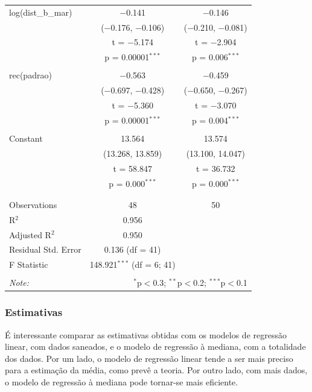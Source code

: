 \documentclass[a4paper, 12pt]{article}
\begin{document}
\begin{table}[!htbp]
\begin{tabular}{@{\extracolsep{5pt}}lcc}
 log(dist\_b\_mar) & $-$0.141 & $-$0.146 \\ 
  & ($-$0.176, $-$0.106) & ($-$0.210, $-$0.081) \\ 
  & t = $-$5.174 & t = $-$2.904 \\ 
  & p = 0.00001$^{***}$ & p = 0.006$^{***}$ \\ 
  & & \\ 
 rec(padrao) & $-$0.563 & $-$0.459 \\ 
  & ($-$0.697, $-$0.428) & ($-$0.650, $-$0.267) \\ 
  & t = $-$5.360 & t = $-$3.070 \\ 
  & p = 0.00001$^{***}$ & p = 0.004$^{***}$ \\ 
  & & \\ 
 Constant & 13.564 & 13.574 \\ 
  & (13.268, 13.859) & (13.100, 14.047) \\ 
  & t = 58.847 & t = 36.732 \\ 
  & p = 0.000$^{***}$ & p = 0.000$^{***}$ \\ 
  & & \\ 
\hline \\[-1.8ex] 
Observations & 48 & 50 \\ 
R$^{2}$ & 0.956 &  \\ 
Adjusted R$^{2}$ & 0.950 &  \\ 
Residual Std. Error & 0.136 (df = 41) &  \\ 
F Statistic & 148.921$^{***}$ (df = 6; 41) &  \\ 
\hline 
\hline \\[-1.8ex] 
\textit{Note:}  & \multicolumn{2}{r}{$^{*}$p$<$0.3; $^{**}$p$<$0.2; $^{***}$p$<$0.1} \\ 
\end{tabular} 
\end{table}

\hypertarget{estimativas}{%
\subsubsection{Estimativas}\label{estimativas}}

É interessante comparar as estimativas obtidas com os modelos de
regressão linear, com dados saneados, e o modelo de regressão à mediana,
com a totalidade dos dados. Por um lado, o modelo de regressão linear
tende a ser mais preciso para a estimação da média, como prevê a teoria.
Por outro lado, com mais dados, o modelo de regressão à mediana pode
tornar-se mais eficiente.
\end{document}
